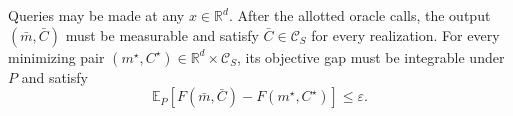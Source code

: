 \documentclass[10pt]{article}
\theoremstyle{definition}
\begin{document}
Queries may be made at any $x\in\mathbb{R}^d$. After the allotted oracle calls, the output $(\bar m,\bar C)$ must be measurable and satisfy $\bar C\in\mathcal{C}_S$ for every realization. For every minimizing pair $(m^\star,C^\star)\in\mathbb{R}^d\times\mathcal{C}_S$, its objective gap must be integrable under $P$ and satisfy
\[
\mathbb{E}_{P}\!\left[F(\bar m,\bar C)-F(m^\star,C^\star)\right]
\leq\varepsilon.
\]
\end{document}
